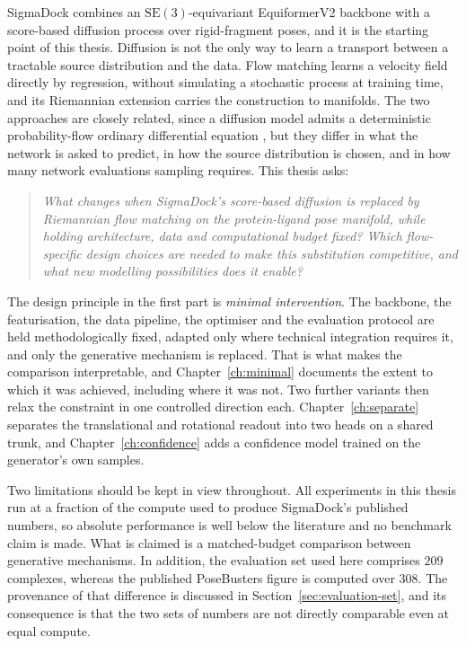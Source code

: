 \documentclass[11pt,a4paper]{report}
\theoremstyle{plain}
\theoremstyle{definition}
\theoremstyle{remark}
\newcommand{\SEthree}{\mathrm{SE}(3)}
\begin{document}
SigmaDock \citep{prat2026sigmadock} combines an $\SEthree$-equivariant
EquiformerV2 backbone \citep{liao2024equiformerv2} with a score-based
diffusion process over rigid-fragment poses, and it is the starting point of
this thesis. Diffusion is not the only way to learn a transport between a
tractable source distribution and the data. Flow matching
\citep{lipman2023flow} learns a velocity field directly by regression, without
simulating a stochastic process at training time, and its Riemannian extension
\citep{chen2024riemannian} carries the construction to manifolds. The two
approaches are closely related, since a diffusion model admits a deterministic
probability-flow ordinary differential equation \citep{song2021sde}, but they
differ in what the network is asked to predict, in how the source distribution
is chosen, and in how many network evaluations sampling requires. This thesis
asks:
\begin{quote}
\itshape
What changes when SigmaDock's score-based diffusion is replaced by Riemannian
flow matching on the protein-ligand pose manifold, while holding architecture,
data and computational budget fixed? Which flow-specific design choices are
needed to make this substitution competitive, and what new modelling
possibilities does it enable?
\end{quote}

\noindent
The design principle in the first part is \emph{minimal intervention}. The
backbone, the featurisation, the data pipeline, the optimiser and the
evaluation protocol are held methodologically fixed, adapted only where
technical integration requires it, and only the generative mechanism is
replaced. That is what makes the comparison interpretable, and
Chapter~\ref{ch:minimal} documents the extent to which it was achieved,
including where it was not. Two further variants then relax the constraint in
one controlled direction each. Chapter~\ref{ch:separate} separates the
translational and rotational readout into two heads on a shared trunk, and
Chapter~\ref{ch:confidence} adds a confidence model trained on the
generator's own samples.

Two limitations should be kept in view throughout. All experiments in this
thesis run at a fraction of the compute used to produce SigmaDock's published
numbers, so absolute performance is well below the literature and no benchmark
claim is made. What is claimed is a matched-budget comparison between
generative mechanisms. In addition, the evaluation set used here comprises $209$
complexes, whereas the published PoseBusters figure is computed over $308$.
The provenance of that difference is discussed in
Section~\ref{sec:evaluation-set}, and its consequence is that the two sets of
numbers are not directly comparable even at equal compute.
\end{document}
